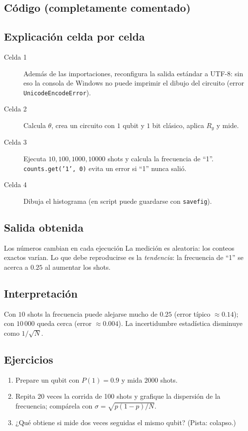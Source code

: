 \subsection{Código (completamente comentado)}


\subsection{Explicación celda por celda}
\begin{description}
  \item[Celda 1] Además de las importaciones, reconfigura la salida estándar a
    UTF-8: sin eso la consola de Windows no puede imprimir el dibujo del
    circuito (error \texttt{UnicodeEncodeError}).
  \item[Celda 2] Calcula $\theta$, crea un circuito con $1$ qubit y $1$ bit
    clásico, aplica $R_y$ y mide.
  \item[Celda 3] Ejecuta $10,100,1000,10000$ shots y calcula la frecuencia de
    ``1''. \texttt{counts.get('1', 0)} evita un error si ``1'' nunca salió.
  \item[Celda 4] Dibuja el histograma (en script puede guardarse con
    \texttt{savefig}).
\end{description}

\subsection{Salida obtenida}
\begin{nota}{Los números cambian en cada ejecución}
La medición es aleatoria: los conteos exactos varían. Lo que debe
reproducirse es la \emph{tendencia}: la frecuencia de ``1'' se acerca a
$0.25$ al aumentar los shots.
\end{nota}


\subsection{Interpretación}
Con $10$ shots la frecuencia puede alejarse mucho de $0.25$ (error típico
$\approx0.14$); con $10\,000$ queda cerca (error $\approx0.004$). La
incertidumbre estadística disminuye como $1/\sqrt N$.

\subsection{Ejercicios}
\begin{enumerate}
  \item Prepare un qubit con $P(1)=0.9$ y mida $2000$ shots.
  \item Repita 20 veces la corrida de 100 shots y grafique la dispersión de
    la frecuencia; compárela con $\sigma=\sqrt{p(1-p)/N}$.
  \item ¿Qué obtiene si mide dos veces seguidas el mismo qubit? (Pista:
    colapso.)
\end{enumerate}


